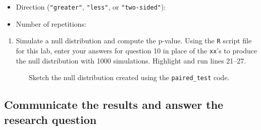 \documentclass[
]{report}
\newenvironment{Shaded}{\begin{snugshade}}{\end{snugshade}}
\newcommand{\AttributeTok}[1]{\textcolor[rgb]{0.77,0.63,0.00}{#1}}
\newcommand{\CommentTok}[1]{\textcolor[rgb]{0.56,0.35,0.01}{\textit{#1}}}
\newcommand{\DecValTok}[1]{\textcolor[rgb]{0.00,0.00,0.81}{#1}}
\newcommand{\FunctionTok}[1]{\textcolor[rgb]{0.00,0.00,0.00}{#1}}
\newcommand{\NormalTok}[1]{#1}
\newcommand{\SpecialCharTok}[1]{\textcolor[rgb]{0.00,0.00,0.00}{#1}}
\newcommand{\StringTok}[1]{\textcolor[rgb]{0.31,0.60,0.02}{#1}}
\providecommand{\tightlist}{%
  \setlength{\itemsep}{0pt}\setlength{\parskip}{0pt}}
\begin{document}
\begin{itemize}
\tightlist
\item
  Direction (\texttt{"greater"}, \texttt{"less"}, or \texttt{"two-sided"}):
\end{itemize}

\vspace{.2in}

\begin{itemize}
\tightlist
\item
  Number of repetitions:
\end{itemize}

\vspace{.2in}

\begin{enumerate}
\def\labelenumi{\arabic{enumi}.}
\setcounter{enumi}{11}
\tightlist
\item
  Simulate a null distribution and compute the p-value. Using the \texttt{R} script file for this lab, enter your answers for question 10 in place of the \texttt{xx}'s to produce the null distribution with 1000 simulations. Highlight and run lines 21--27.
\end{enumerate}

\begin{Shaded}
\end{Shaded}

~~~~~~~Sketch the null distribution created using the \texttt{paired\_test} code.

\vspace{1.5in}

\hypertarget{communicate-the-results-and-answer-the-research-question-3}{%
\subsection*{Communicate the results and answer the research question}\label{communicate-the-results-and-answer-the-research-question-3}}
\end{document}
